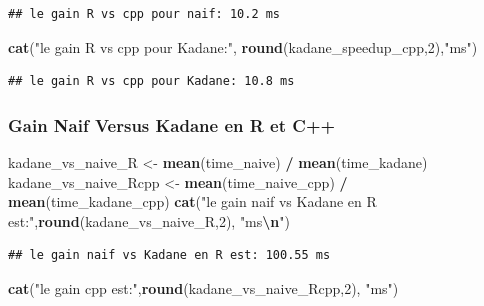 \documentclass[
]{article}
\newenvironment{Shaded}{\begin{snugshade}}{\end{snugshade}}
\newcommand{\DecValTok}[1]{\textcolor[rgb]{0.00,0.00,0.81}{#1}}
\newcommand{\FunctionTok}[1]{\textcolor[rgb]{0.13,0.29,0.53}{\textbf{#1}}}
\newcommand{\NormalTok}[1]{#1}
\newcommand{\OtherTok}[1]{\textcolor[rgb]{0.56,0.35,0.01}{#1}}
\newcommand{\SpecialCharTok}[1]{\textcolor[rgb]{0.81,0.36,0.00}{\textbf{#1}}}
\newcommand{\StringTok}[1]{\textcolor[rgb]{0.31,0.60,0.02}{#1}}
\begin{document}
\begin{verbatim}
## le gain R vs cpp pour naif: 10.2 ms
\end{verbatim}

\begin{Shaded}
\begin{Highlighting}[]
\FunctionTok{cat}\NormalTok{(}\StringTok{"le gain R vs cpp pour Kadane:"}\NormalTok{, }\FunctionTok{round}\NormalTok{(kadane\_speedup\_cpp,}\DecValTok{2}\NormalTok{),}\StringTok{"ms"}\NormalTok{)}
\end{Highlighting}
\end{Shaded}

\begin{verbatim}
## le gain R vs cpp pour Kadane: 10.8 ms
\end{verbatim}

\subsubsection{Gain Naif Versus Kadane en R et
C++}\label{gain-naif-versus-kadane-en-r-et-c}

\begin{Shaded}
\begin{Highlighting}[]
\NormalTok{kadane\_vs\_naive\_R }\OtherTok{\textless{}{-}} \FunctionTok{mean}\NormalTok{(time\_naive) }\SpecialCharTok{/} \FunctionTok{mean}\NormalTok{(time\_kadane)}
\NormalTok{kadane\_vs\_naive\_Rcpp }\OtherTok{\textless{}{-}} \FunctionTok{mean}\NormalTok{(time\_naive\_cpp) }\SpecialCharTok{/} \FunctionTok{mean}\NormalTok{(time\_kadane\_cpp)}
\FunctionTok{cat}\NormalTok{(}\StringTok{"le gain naif vs Kadane en R est:"}\NormalTok{,}\FunctionTok{round}\NormalTok{(kadane\_vs\_naive\_R,}\DecValTok{2}\NormalTok{), }\StringTok{"ms}\SpecialCharTok{\textbackslash{}n}\StringTok{"}\NormalTok{)}
\end{Highlighting}
\end{Shaded}

\begin{verbatim}
## le gain naif vs Kadane en R est: 100.55 ms
\end{verbatim}

\begin{Shaded}
\begin{Highlighting}[]
\FunctionTok{cat}\NormalTok{(}\StringTok{"le gain cpp est:"}\NormalTok{,}\FunctionTok{round}\NormalTok{(kadane\_vs\_naive\_Rcpp,}\DecValTok{2}\NormalTok{), }\StringTok{"ms"}\NormalTok{)}
\end{Highlighting}
\end{Shaded}
\end{document}
